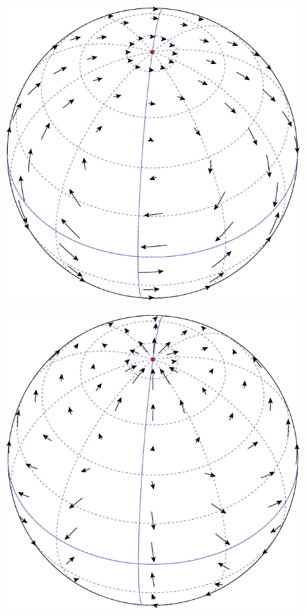 \begin{figure}
\ \\

\begin{minipage}[b]{.5\linewidth}
\centering
\includegraphics[scale=0.7]{images/Xlm2m1.pdf}
\label{fig:basis_xlmzlm_c}
\end{minipage}%
\begin{minipage}[b]{.5\linewidth}
\centering
\includegraphics[scale=0.7]{images/Zlm2m1.pdf}
\label{fig:basis_xlmzlm_d}
\end{minipage}


\end{figure}
